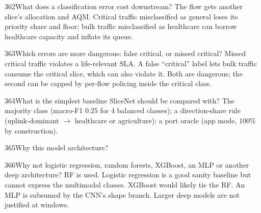 \begin{qa}{362}{What does a classification error cost downstream?}
The flow gets another slice's allocation and AQM. Critical traffic misclassified as general loses its priority
share and floor; bulk traffic misclassified as healthcare can borrow healthcare capacity and inflate its queue.
\end{qa}

\begin{qa}{363}{Which errors are more dangerous: false critical, or missed critical?}
Missed critical traffic violates a life-relevant SLA. A false ``critical'' label lets bulk traffic consume the critical
slice, which can also violate it. Both are dangerous; the second can be capped by per-flow policing inside the critical
class.
\end{qa}

\begin{qa}{364}{What is the simplest baseline SliceNet should be compared with?}
The majority class (macro-F1 0.25 for 4 balanced classes); a direction-share rule (uplink-dominant $\rightarrow$
healthcare or agriculture); a port oracle (app mode, 100\% by construction).
\end{qa}

\begin{qa}{365}{Why this model architecture?}
\end{qa}

\begin{qa}{366}{Why not logistic regression, random forests, XGBoost, an MLP or another deep architecture?}
RF is used. Logistic regression is a good sanity baseline but cannot express the multimodal classes. XGBoost would
likely tie the RF. An MLP is subsumed by the CNN's shape branch. Larger deep models are not justified at
\NSnRows{} windows.
\end{qa}

